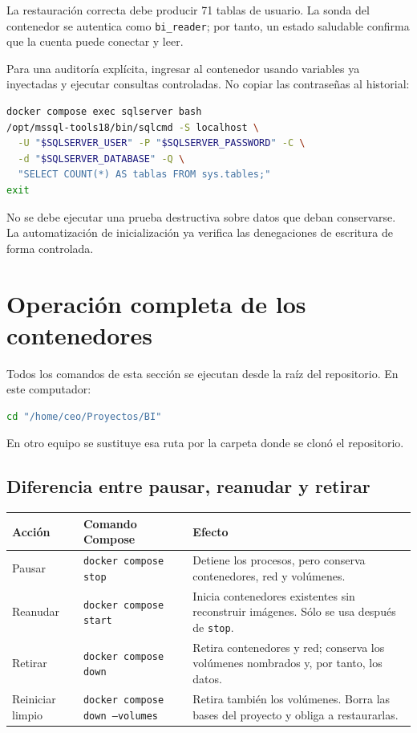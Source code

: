 \documentclass[11pt,letterpaper]{article}
\newcommand{\file}[1]{\texttt{#1}}
\begin{document}
La restauración correcta debe producir 71 tablas de usuario. La sonda del contenedor se autentica como \file{bi\_reader}; por tanto, un estado saludable confirma que la cuenta puede conectar y leer.

Para una auditoría explícita, ingresar al contenedor usando variables ya inyectadas y ejecutar consultas controladas. No copiar las contraseñas al historial:

\begin{lstlisting}[style=terminal,language=bash]
docker compose exec sqlserver bash
/opt/mssql-tools18/bin/sqlcmd -S localhost \
  -U "$SQLSERVER_USER" -P "$SQLSERVER_PASSWORD" -C \
  -d "$SQLSERVER_DATABASE" -Q \
  "SELECT COUNT(*) AS tablas FROM sys.tables;"
exit
\end{lstlisting}

No se debe ejecutar una prueba destructiva sobre datos que deban conservarse. La automatización de inicialización ya verifica las denegaciones de escritura de forma controlada.

\section{Operación completa de los contenedores}

Todos los comandos de esta sección se ejecutan desde la raíz del repositorio. En este computador:

\begin{lstlisting}[style=terminal,language=bash]
cd "/home/ceo/Proyectos/BI"
\end{lstlisting}

En otro equipo se sustituye esa ruta por la carpeta donde se clonó el repositorio.

\subsection{Diferencia entre pausar, reanudar y retirar}

\begin{tabularx}{\textwidth}{@{}p{}p{}X@{}}
  \toprule
  Acción & Comando Compose & Efecto \\
  \midrule
  Pausar & \file{docker compose stop} & Detiene los procesos, pero conserva contenedores, red y volúmenes. \\
  Reanudar & \file{docker compose start} & Inicia contenedores existentes sin reconstruir imágenes. Sólo se usa después de \file{stop}. \\
  Retirar & \file{docker compose down} & Retira contenedores y red; conserva los volúmenes nombrados y, por tanto, los datos. \\
  Reiniciar limpio & \file{docker compose down --volumes} & Retira también los volúmenes. Borra las bases del proyecto y obliga a restaurarlas. \\
  \bottomrule
\end{tabularx}
\end{document}
